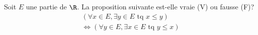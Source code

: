 Soit $E$ une partie de $\R$. La proposition suivante est-elle vraie (V) ou fausse (F)?
\begin{multline*}
\left(\forall x\in E, \exists y \in E \text{ tq } x \leq y \right) \\  
\Leftrightarrow
\left(\forall y\in E, \exists x \in E \text{ tq } y \leq x \right)   
\end{multline*}
